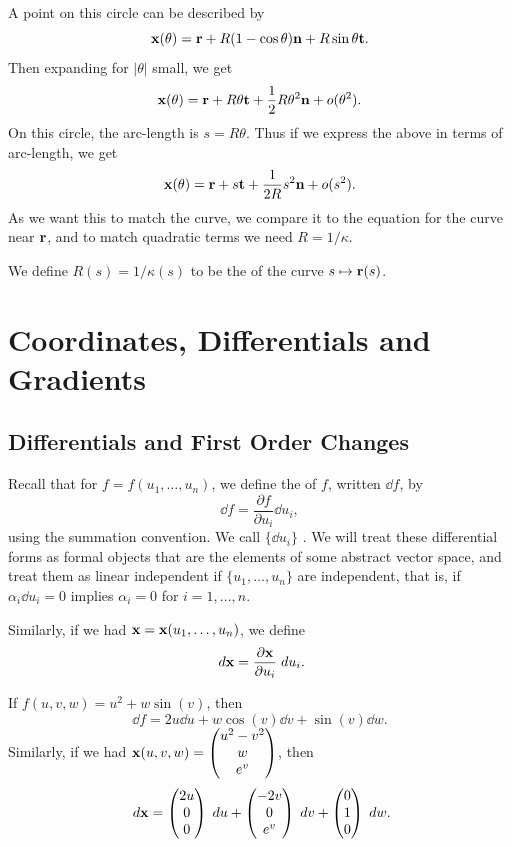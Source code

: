 \documentclass[a4paper]{scrartcl}
\begin{document}
A point on this circle can be described by
$$
\mathbf{x}(\theta) = \mathbf{r} + R(1 - \cos \theta) \mathbf{n} + R \sin \theta \mathbf{t}.
$$
Then expanding for $|\theta|$ small, we get
$$
\mathbf{x} (\theta) = \mathbf{r} + R \theta \mathbf{t} + \frac{1}{2} R \theta^2 \mathbf{n} + o(\theta^2).
$$
On this circle, the arc-length is $s = R \theta$. Thus if we express the above in terms of arc-length, we get
$$
\mathbf{x}(\theta) = \mathbf{r} + s \mathbf{t} + \frac{1}{2R} s^2 \mathbf{n} + o(s^2).
$$
As we want this to match the curve, we compare it to the equation for the curve near $\mathbf{r}$, and to match quadratic terms we need
$R = 1/\kappa$.

\begin{definition}
	We define $R(s)=1/\kappa(s)$ to be the  of the curve $s \mapsto \mathbf{r}(s)$.
\end{definition}

\section{Coordinates, Differentials and Gradients}

\subsection{Differentials and First Order Changes}

Recall that for $f = f(u_1, \dots, u_n)$, we define the  of $f$, written $\dd f$, by
$$
\dd f = \frac{\partial f}{\partial u_i} \dd u_i,
$$
using the summation convention. We call $\{\dd u_i\}$ . We will treat these differential forms as formal objects that are the elements of some abstract vector space, and treat them as linear independent if $\{u_1,  \dots, u_n\}$ are independent, that is, if $\alpha_i \dd u_i = 0$ implies $\alpha_i = 0$ for $i = 1, \dots, n$.

Similarly, if we had $\mathbf{x} = \mathbf{x}(u_1, \dots, u_n)$, we define
$$
\; d \mathbf{x} = \frac{\partial \mathbf{x}}{\partial u_i} \; d u_i.
$$

\begin{example}
	If $f(u, v, w) = u^2 + w\sin(v)$, then
	$$
	\dd f = 2 u \dd u + w \cos (v) \dd v + \sin (v) \dd w.
$$
Similarly, if we had $\mathbf{x}(u, v, w) = \begin{pmatrix}
	u^2 - v^2 \\ w \\ e^v
\end{pmatrix}$, then
$$
\; d \mathbf{x} = \begin{pmatrix}
	2u \\ 0 \\ 0\end{pmatrix}
 \; d u + \begin{pmatrix}
	 - 2v \\ 0 \\ e^v
 \end{pmatrix} \; d v + \begin{pmatrix}
	 0 \\ 1 \\ 0
 \end{pmatrix} \; d w.
$$
\end{example}
\end{document}
